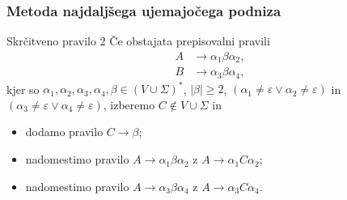 \documentclass{beamer}
\theoremstyle{definition}
\providecommand{\abs}[1]{\left\lvert #1 \right\rvert}
\begin{document}
\begin{frame}
    \frametitle{Metoda najdaljšega ujemajočega podniza}
    \begin{block}{Skrčitveno pravilo 2}
        Če obstajata prepisovalni pravili
        \begin{align*}
            A &\rightarrow \alpha_1 \beta \alpha_2, \\
            B &\rightarrow \alpha_3 \beta \alpha_4,
        \end{align*}
        kjer so $\alpha_1, \alpha_2, \alpha_3, \alpha_4, \beta \in (V \cup \Sigma)^*$, $\abs{\beta} \geq 2$,
        $(\alpha_1 \neq \varepsilon \vee \alpha_2 \neq \varepsilon)$ in 
        $(\alpha_3 \neq \varepsilon \vee \alpha_4 \neq \varepsilon)$,
        izberemo $C \notin V \cup \Sigma$ in
        \begin{itemize}
            \item dodamo pravilo $C \rightarrow \beta$;
            \item nadomestimo pravilo $A \rightarrow \alpha_1 \beta \alpha_2$ 
            z $A \rightarrow \alpha_1 C \alpha_2$;
            \item nadomestimo pravilo $A \rightarrow \alpha_3 \beta \alpha_4$ 
            z $A \rightarrow \alpha_3 C \alpha_4$.
        \end{itemize}
    \end{block}
\end{frame}
\end{document}
